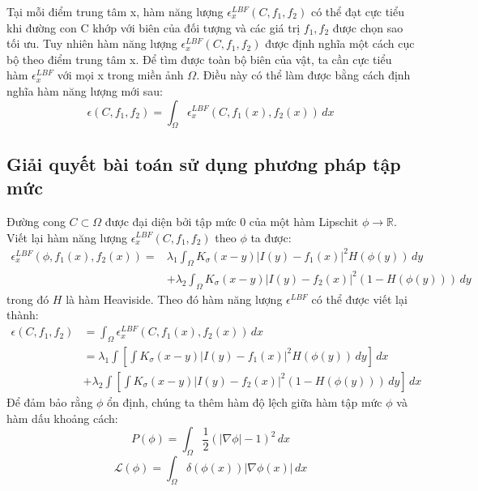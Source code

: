 \documentclass[12pt, oneside, a4paper]{book}
\begin{document}
Tại mỗi điểm trung tâm x, hàm năng lượng $\epsilon_x^{LBF}(C,f_1, f_2)$   có thể đạt cực tiểu khi đường con C khớp với biên của đối tượng và các giá trị $f_1, f_2$ được chọn sao tối ưu. Tuy nhiên hàm năng lượng $\epsilon_x^{LBF}(C,f_1, f_2)$ được định nghĩa một cách cục bộ theo điểm trung tâm x. Để tìm được toàn bộ biên của vật, ta cần cực tiểu hàm $\epsilon_x^{LBF}$  với mọi x trong miền ảnh $\Omega$. Điều này có thể làm được bằng cách định nghĩa hàm năng lượng mới sau:
\begin{equation}
\epsilon(C, f_1, f_2)=\int_{\Omega} \epsilon_x^{LBF}(C, f_1(x), f_2(x))\,dx
\end{equation}
\subsection{Giải quyết bài toán sử dụng phương pháp tập mức}
Đường cong $C \subset \Omega$ được đại diện bởi tập mức 0 của một hàm Lipschit $\phi \rightarrow \mathbb{R}$. Viết lại hàm năng lượng $\epsilon_x^{LBF}(C,f_1, f_2)$ theo $\phi$ ta được:
\begin{equation*}
\begin{split}
\epsilon_x^{LBF}(\phi, f_1(x), f_2(x))
=&\lambda_1 \int_{\Omega} K_{\sigma}(x-y)|I(y)-f_1(x)|^2H(\phi(y))\,dy\\ &+ \lambda_2 \int_{\Omega} K_{\sigma}(x-y)|I(y)-f_2(x)|^2(1-H(\phi(y)))\,dy 
\end{split}
\end{equation*}
trong đó $H$ là hàm Heaviside. Theo đó hàm năng lượng $\epsilon^{LBF}$ có thể được viết lại thành:
\begin{equation*}
\begin{split}
\epsilon(C, f_1, f_2)&=\int_{\Omega} \epsilon_x^{LBF}(C, f_1(x), f_2(x))\,dx\\
&=\lambda_1 \int\left[\int K_{\sigma}(x-y)|I(y)-f_1(x)|^2H(\phi(y))\,dy\right]\,dx \\
&+ \lambda_2 \int\left[\int K_{\sigma}(x-y)|I(y)-f_2(x)|^2(1-H(\phi(y)))\,dy \right]\,dx
\end{split}
\end{equation*}
Để đảm bảo rằng $\phi$ ổn định, chúng ta thêm hàm độ lệch giữa hàm tập mức $\phi$ và hàm dấu khoảng cách:
\begin{equation*}
P(\phi)= \int_{\Omega}\dfrac{1}{2}(|\nabla \phi|-1)^2\,dx
\end{equation*}
\begin{equation*}
\mathcal{L}(\phi)=\int_{\Omega}\delta(\phi(x))|\nabla \phi(x)|\,dx
\end{equation*}
\end{document}
